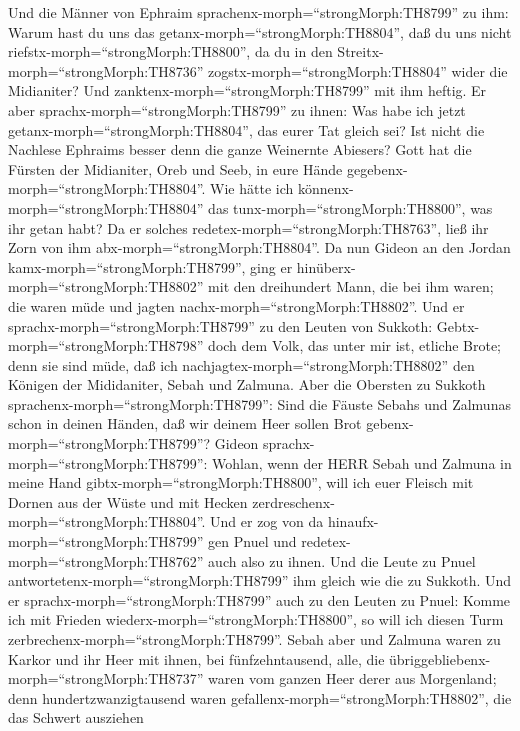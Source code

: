  Und die Männer von Ephraim
sprachenx-morph=``strongMorph:TH8799'' zu ihm: Warum hast du uns das
getanx-morph=``strongMorph:TH8804'', daß du uns nicht
riefstx-morph=``strongMorph:TH8800'', da du in den
Streitx-morph=``strongMorph:TH8736'' zogstx-morph=``strongMorph:TH8804''
wider die Midianiter? Und zanktenx-morph=``strongMorph:TH8799'' mit ihm
heftig.  Er aber sprachx-morph=``strongMorph:TH8799'' zu
ihnen: Was habe ich jetzt getanx-morph=``strongMorph:TH8804'', das eurer
Tat gleich sei? Ist nicht die Nachlese Ephraims besser denn die ganze
Weinernte Abiesers?  Gott hat die Fürsten der Midianiter,
Oreb und Seeb, in eure Hände gegebenx-morph=``strongMorph:TH8804''. Wie
hätte ich könnenx-morph=``strongMorph:TH8804'' das
tunx-morph=``strongMorph:TH8800'', was ihr getan habt? Da er solches
redetex-morph=``strongMorph:TH8763'', ließ ihr Zorn von ihm
abx-morph=``strongMorph:TH8804''.  Da nun Gideon an den
Jordan kamx-morph=``strongMorph:TH8799'', ging er
hinüberx-morph=``strongMorph:TH8802'' mit den dreihundert Mann, die bei
ihm waren; die waren müde und jagten nachx-morph=``strongMorph:TH8802''.
 Und er sprachx-morph=``strongMorph:TH8799'' zu den Leuten
von Sukkoth: Gebtx-morph=``strongMorph:TH8798'' doch dem Volk, das unter
mir ist, etliche Brote; denn sie sind müde, daß ich
nachjagtex-morph=``strongMorph:TH8802'' den Königen der Mididaniter,
Sebah und Zalmuna.  Aber die Obersten zu Sukkoth
sprachenx-morph=``strongMorph:TH8799'': Sind die Fäuste Sebahs und
Zalmunas schon in deinen Händen, daß wir deinem Heer sollen Brot
gebenx-morph=``strongMorph:TH8799''?  Gideon
sprachx-morph=``strongMorph:TH8799'': Wohlan, wenn der HERR Sebah und
Zalmuna in meine Hand gibtx-morph=``strongMorph:TH8800'', will ich euer
Fleisch mit Dornen aus der Wüste und mit Hecken
zerdreschenx-morph=``strongMorph:TH8804''.  Und er zog von
da hinaufx-morph=``strongMorph:TH8799'' gen Pnuel und
redetex-morph=``strongMorph:TH8762'' auch also zu ihnen. Und die Leute
zu Pnuel antwortetenx-morph=``strongMorph:TH8799'' ihm gleich wie die zu
Sukkoth.  Und er sprachx-morph=``strongMorph:TH8799'' auch
zu den Leuten zu Pnuel: Komme ich mit Frieden
wiederx-morph=``strongMorph:TH8800'', so will ich diesen Turm
zerbrechenx-morph=``strongMorph:TH8799''.  Sebah aber und
Zalmuna waren zu Karkor und ihr Heer mit ihnen, bei fünfzehntausend,
alle, die übriggebliebenx-morph=``strongMorph:TH8737'' waren vom ganzen
Heer derer aus Morgenland; denn hundertzwanzigtausend waren
gefallenx-morph=``strongMorph:TH8802'', die das Schwert ausziehen
